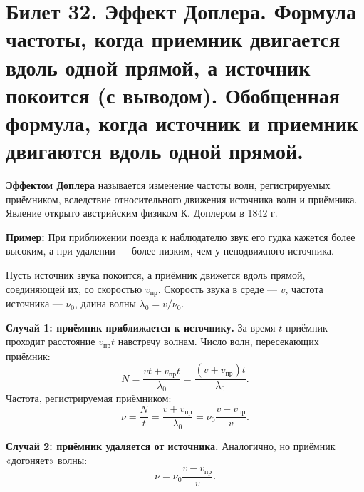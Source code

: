 \section{Билет 32. Эффект Доплера. Формула частоты, когда приемник двигается вдоль одной прямой, а источник покоится (с выводом). Обобщенная формула, когда источник и приемник двигаются вдоль одной прямой.}

\begin{definition}
\textbf{Эффектом Доплера} называется изменение частоты волн, регистрируемых приёмником, вследствие относительного движения источника волн и приёмника. Явление открыто австрийским физиком К. Доплером в 1842 г.
\par\noindent\textbf{Пример:} При приближении поезда к наблюдателю звук его гудка кажется более высоким, а при удалении --- более низким, чем у неподвижного источника.
\end{definition}

\begin{theorem}
Пусть источник звука покоится, а приёмник движется вдоль прямой, соединяющей их, со скоростью $v_{\text{пр}}$. Скорость звука в среде --- $v$, частота источника --- $\nu_0$, длина волны $\lambda_0 = v/\nu_0$.

\textbf{Случай 1: приёмник приближается к источнику.}
За время $t$ приёмник проходит расстояние $v_{\text{пр}} t$ навстречу волнам. Число волн, пересекающих приёмник:
\begin{equation}
    N = \frac{v t + v_{\text{пр}} t}{\lambda_0} = \frac{(v + v_{\text{пр}}) t}{\lambda_0}.
\end{equation}
Частота, регистрируемая приёмником:
\begin{equation}
    \nu = \frac{N}{t} = \frac{v + v_{\text{пр}}}{\lambda_0} = \nu_0 \frac{v + v_{\text{пр}}}{v}. \label{eq:doppler_approach}
\end{equation}

\textbf{Случай 2: приёмник удаляется от источника.}
Аналогично, но приёмник «догоняет» волны:
\begin{equation}
    \nu = \nu_0 \frac{v - v_{\text{пр}}}{v}. \label{eq:doppler_recede}
\end{equation}
\end{theorem}

